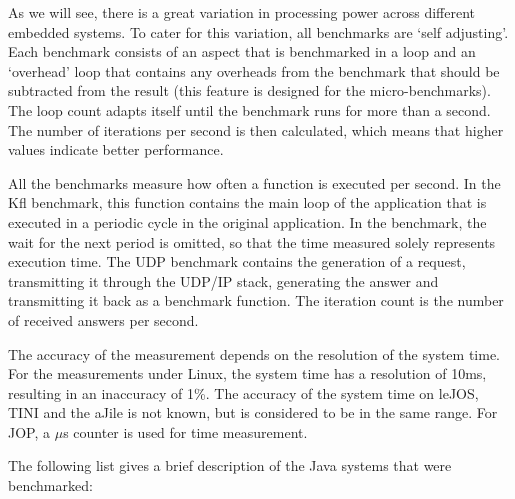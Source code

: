 As we will see, there is a great variation in processing power
across different embedded systems. To cater for this variation, all
benchmarks are `self adjusting'. Each benchmark consists of an
aspect that is benchmarked in a loop and an `overhead' loop that
contains any overheads from the benchmark that should be subtracted
from the result (this feature is designed for the micro-benchmarks).
The loop count adapts itself until the benchmark runs for more than
a second. The number of iterations per second is then calculated,
which means that higher values indicate better performance.


All the benchmarks measure how often a function is executed per
second. In the Kfl benchmark, this function contains the main loop of
the application that is executed in a periodic cycle in the original
application. In the benchmark, the wait for the next period is
omitted, so that the time measured solely represents execution time.
The UDP benchmark contains the generation of a request, transmitting
it through the UDP/IP stack, generating the answer and transmitting
it back as a benchmark function. The iteration count is the number of
received answers per second.

The accuracy of the measurement depends on the resolution of the
system time. For the measurements under Linux, the system time has a
resolution of 10ms, resulting in an inaccuracy of 1\%. The accuracy
of the system time on leJOS, TINI and the aJile is not known, but is
considered to be in the same range. For JOP, a $\mu$s counter is
used for time measurement.


The following list gives a brief description of the Java systems
that were benchmarked:

